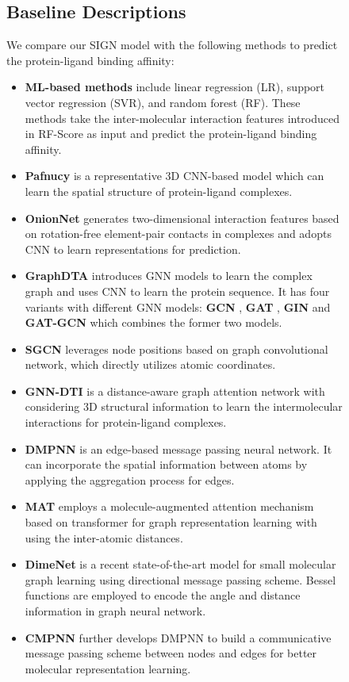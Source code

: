 \documentclass[sigconf]{acmart}
\newcommand{\B}[1]{{\bfseries #1}}
\newcommand{\model}{\textsf{SIGN}\xspace}
\begin{document}
\begin{figure}
\subsection{Baseline Descriptions}
We compare our \model model with the following methods to predict the protein-ligand binding affinity:
\label{a-baseline}
\begin{itemize}[leftmargin=*,topsep=3pt]
    \item \B{ML-based methods} include linear regression (LR), support vector regression (SVR), and random forest (RF). These methods take the inter-molecular interaction features introduced in RF-Score \cite{ballester2010machine} as input and predict the protein-ligand binding affinity.
    \item \B{Pafnucy} \cite{stepniewska2018development} is a representative 3D CNN-based model which can learn the spatial structure of protein-ligand complexes.
    \item \B{OnionNet} \cite{zheng2019onionnet} generates two-dimensional interaction features based on rotation-free element-pair contacts in complexes and adopts CNN to learn representations for prediction.
    \item \B{GraphDTA} \cite{10.1093/bioinformatics/btaa921} introduces GNN models to learn the complex graph and uses CNN to learn the protein sequence. It has four variants with different GNN models: \B{GCN} \cite{kipf2017semi}, \B{GAT} \cite{velivckovic2018graph}, \B{GIN} \cite{xu2018powerful} and \B{GAT-GCN} which combines the former two models.
    \item \B{SGCN} \cite{danel2020spatial} leverages node positions based on graph convolutional network, which directly utilizes atomic coordinates.
    \item \B{GNN-DTI} \cite{lim2019predicting} is a distance-aware graph attention network with considering 3D structural information to learn the intermolecular interactions for protein-ligand complexes.
    \item \B{DMPNN} \cite{yang2019analyzing} is an edge-based message passing neural network. It can incorporate the spatial information between atoms by applying the aggregation process for edges.
    \item \B{MAT} \cite{maziarka2020molecule} employs a molecule-augmented attention mechanism based on transformer for graph representation learning with using the inter-atomic distances.
    \item \B{DimeNet} \cite{klicpera_dimenet_2020} is a recent state-of-the-art model for small molecular graph learning using directional message passing scheme. Bessel functions are employed to encode the angle and distance information in graph neural network. 
    \item \B{CMPNN} \cite{song2020communicative} further develops DMPNN to build a communicative message passing scheme between nodes and edges for better molecular representation learning.
\end{itemize}
\vspace{-2mm}

\end{figure}
\end{document}
